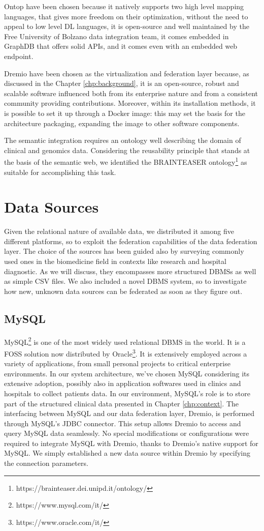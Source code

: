 Ontop have been chosen because it natively supports two high level mapping languages, that gives more freedom on their optimization, without the need to appeal to low level \ac{DL} languages, it is open-source and well maintained by the Free University of Bolzano data integration team, it comes embedded in GraphDB that offers solid \ac{API}s, and it comes even with an embedded web endpoint.

Dremio have been chosen as the virtualization and federation layer because, as discussed in the Chapter \ref{chp:background}, it is an open-source, robust and scalable software influenced both from its enterprise nature and from a consistent community providing contributions. Moreover, within its installation methods, it is possible to set it up through a Docker image: this may set the basis for the architecture packaging, expanding the image to other software components.

The semantic integration requires an ontology well describing the domain of clinical and genomics data. Considering the reusability principle that stands at the basis of the semantic web, we identified the \ac{BRAINTEASER} ontology\footnote{https://brainteaser.dei.unipd.it/ontology/} as suitable for accomplishing this task. 

\section{Data Sources}
Given the relational nature of available data, we distributed it among five different platforms, so to exploit the federation capabilities of the data federation layer. The choice of the sources has been guided also by surveying commonly used ones in the biomedicine field in contexts like research and hospital diagnostic. As we will discuss, they encompasses more structured \ac{DBMS}s as well as simple \ac{CSV} files. We also included a novel \ac{DBMS} system, so to investigate how new, unknown data sources can be federated as soon as they figure out.

\subsection{MySQL}
MySQL\footnote{https://www.mysql.com/it/} is one of the most widely used relational \ac{DBMS} in the world. It is a \ac{FOSS} solution now distributed by Oracle\footnote{https://www.oracle.com/it/}. It is extensively employed across a variety of applications, from small personal projects to critical enterprise environments. In our system architecture, we've chosen MySQL considering its extensive adoption, possibly also in application softwares used in clinics and hospitals to collect patients data. 
In our environment, MySQL's role is to store part of the structured clinical data presented in Chapter \ref{chp:context}. 
The interfacing between MySQL and our data federation layer, Dremio, is performed through MySQL's \ac{JDBC} connector. This setup allows Dremio to access and query MySQL data seamlessly.
No special modifications or configurations were required to integrate MySQL with Dremio, thanks to Dremio's native support for MySQL. We simply established a new data source within Dremio by specifying the connection parameters.

